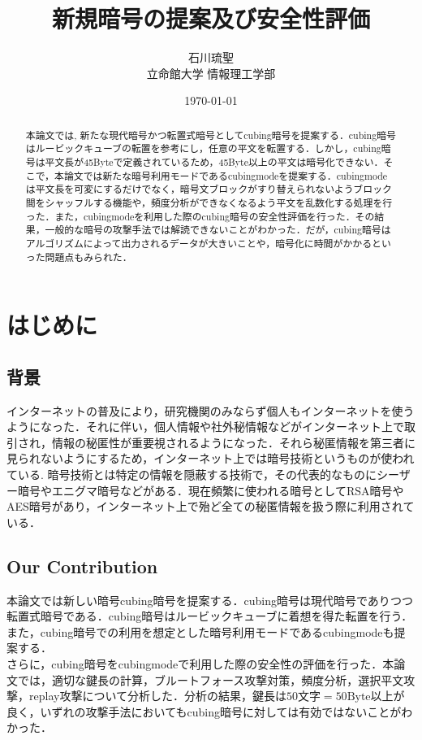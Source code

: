 \documentclass[titlepage]{jarticle}
\title{新規暗号の提案及び安全性評価}
\author{石川琉聖\\立命館大学 情報理工学部}
\date{\today}
\begin{document}
\maketitle

\begin{abstract}
本論文では, 新たな現代暗号かつ転置式暗号としてcubing暗号を提案する．cubing暗号はルービックキューブの転置を参考にし，任意の平文を転置する．しかし，cubing暗号は平文長が45Byteで定義されているため，45Byte以上の平文は暗号化できない．そこで，本論文では新たな暗号利用モードであるcubingmodeを提案する．cubingmodeは平文長を可変にするだけでなく，暗号文ブロックがすり替えられないようブロック間をシャッフルする機能や，頻度分析ができなくなるよう平文を乱数化する処理を行った．また，cubingmodeを利用した際のcubing暗号の安全性評価を行った．その結果，一般的な暗号の攻撃手法では解読できないことがわかった．だが，cubing暗号はアルゴリズムによって出力されるデータが大きいことや，暗号化に時間がかかるといった問題点もみられた．
\end{abstract}

\tableofcontents
\newpage

\section{はじめに}
\subsection{背景}
インターネットの普及により，研究機関のみならず個人もインターネットを使うようになった．それに伴い，個人情報や社外秘情報などがインターネット上で取引され，情報の秘匿性が重要視されるようになった．それら秘匿情報を第三者に見られないようにするため，インターネット上では暗号技術というものが使われている.
暗号技術とは特定の情報を隠蔽する技術で，その代表的なものにシーザー暗号やエニグマ暗号などがある．現在頻繁に使われる暗号としてRSA暗号やAES暗号があり，インターネット上で殆ど全ての秘匿情報を扱う際に利用されている．\\

\subsection{Our Contribution}
本論文では新しい暗号cubing暗号を提案する．cubing暗号は現代暗号でありつつ転置式暗号である．cubing暗号はルービックキューブに着想を得た転置を行う．また，cubing暗号での利用を想定とした暗号利用モードであるcubingmodeも提案する．\\
さらに，cubing暗号をcubingmodeで利用した際の安全性の評価を行った．本論文では，適切な鍵長の計算，ブルートフォース攻撃対策，頻度分析，選択平文攻撃，replay攻撃について分析した．分析の結果，鍵長は\(50\)文字\(=50\text{Byte}\)以上が良く，いずれの攻撃手法においてもcubing暗号に対しては有効ではないことがわかった．
\end{document}
